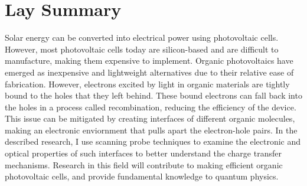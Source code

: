 

\chapter{Lay Summary}

Solar energy can be converted into electrical power using photovoltaic cells. However, most photovoltaic cells today are silicon-based and are difficult to manufacture, making them expensive to implement. Organic photovoltaics have emerged as inexpensive and lightweight alternatives due to their relative ease of fabrication. However, electrons excited by light in organic materials are tightly bound to the holes that they left behind. These bound electrons can fall back into the holes in a process called recombination, reducing the efficiency of the device. This issue can be mitigated by creating interfaces of different organic molecules, making an electronic enviornment that pulls apart the electron-hole pairs. In the described research, I use scanning probe techniques to examine the electronic and optical properties of such interfaces to better understand the charge transfer mechanisms. Research in this field will contribute to making efficient organic photovoltaic cells, and provide fundamental knowledge to quantum physics.

\endinput
With an increasing global demand for energy, along with a dwindling supply of fossil fuels, there is a heightened interest in the research of sustainable energy sources, in particular, the abundant and accessible solar energy. 

Incoming light energy from the sun excites electrons in photovoltaic materials, which in turn produces a current that can be used for electrical work. 